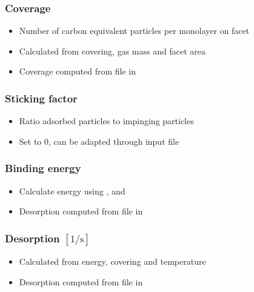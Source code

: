 \subsubsection{Coverage}
\begin{itemize}[noitemsep,topsep=0pt]
\item Number of carbon equivalent particles per monolayer on facet
\item Calculated from covering, gas mass and facet area
\item Coverage computed from  file in 
\end{itemize}

\subsubsection{Sticking factor}
\begin{itemize}[noitemsep,topsep=0pt]
\item Ratio adsorbed particles to impinging particles
\item Set to 0, can be adapted through input file
\end{itemize}

\subsubsection{Binding energy}
\begin{itemize}[noitemsep,topsep=0pt]
\item Calculate energy using ,  and 
\item Desorption computed from  file in 
\end{itemize}

\subsubsection{Desorption $[1/\text{s}]$}
\begin{itemize}[noitemsep,topsep=0pt]
\item Calculated from energy, covering and temperature
\item Desorption computed from  file in 
\end{itemize}

